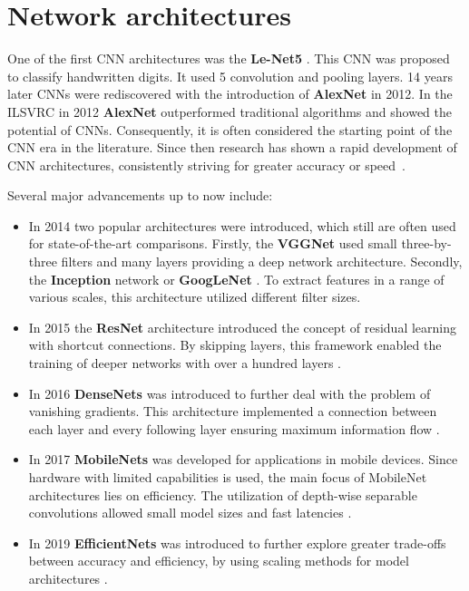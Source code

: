 \section{Network architectures}
\label{sec:networkArchitectures}

One of the first \ac{CNN} architectures was the \textbf{Le-Net5} \cite{LeNet5}.
This \ac{CNN} was proposed to classify handwritten digits.
It used 5 convolution and pooling layers.
14 years later \ac{CNN}s were rediscovered with the introduction of \textbf{AlexNet} \cite{AlexNet2012} in 2012.
In the \ac{ILSVRC} \cite{ILSVRC15} in 2012 \textbf{AlexNet} outperformed traditional algorithms and showed the potential of \ac{CNN}s.
Consequently, it is often considered the starting point of the \ac{CNN} era in the literature.
Since then research has shown a rapid development of \ac{CNN} architectures, consistently striving for greater accuracy or speed~\cite{networkArchitectureSurvey}.

\vspace{1cm} %

\noindent Several major advancements up to now include:

\begin{itemize}
    \item In 2014 two popular architectures were introduced, which still are often used for state-of-the-art comparisons. Firstly, the \textbf{\ac{VGGNet}} \cite{VGGNet2015} used small three-by-three filters and many layers providing a deep network architecture. Secondly, the \textbf{Inception} network or \textbf{GoogLeNet} \cite{InceptionNet}. To extract features in a range of various scales, this architecture utilized different filter sizes.
    \item In 2015 the \textbf{ResNet} architecture \cite{ResNet} introduced the concept of residual learning with shortcut connections. By skipping layers, this framework enabled the training of deeper networks with over a hundred layers \cite{networkArchitectureSurvey}.
    \item In 2016 \textbf{DenseNets} \cite{DenseNets} was introduced to further deal with the problem of vanishing gradients. This architecture implemented a connection between each layer and every following layer ensuring maximum information flow \cite{networkArchitectureSurvey}.
    \item In 2017 \textbf{MobileNets} \cite{MobileNetV1, MobileNetV2, MobileNetV3} was developed for applications in mobile devices. Since hardware with limited capabilities is used, the main focus of MobileNet architectures lies on efficiency. The utilization of depth-wise separable convolutions allowed small model sizes and fast latencies \cite{networkArchitectureSurvey}.
    \item In 2019 \textbf{EfficientNets} \cite{EfficientNet} was introduced to further explore greater trade-offs between accuracy and efficiency, by using scaling methods for model architectures \cite{networkArchitectureSurvey}. 
\end{itemize}

